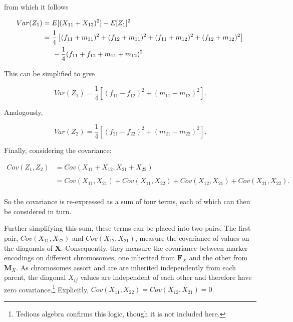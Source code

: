 \documentclass{article}
\newcommand{\m}[1]{\mathbf{#1}}               %
\begin{document}
\noindent from which it follows

\begin{equation*}
  \begin{split}
    Var(Z_1) & = E[(X_{11} + X_{12})^2] - E[Z_1]^2 \\
    & = \frac{1}{4}\left [ (f_{11} + m_{11})^2 + (f_{12} + m_{11})^2 + (f_{11} + m_{12})^2 + (f_{12} + m_{12})^2 \right ] \\
    & \hspace{0.5cm} - \frac{1}{4}(f_{11} + f_{12} + m_{11} + m_{12})^2. \\
  \end{split}
\end{equation*}

\noindent This can be simplified to give

\begin{equation} \label{eq:z1var}
  Var(Z_1) = \frac{1}{4} \left [ (f_{11} - f_{12})^2 + (m_{11} - m_{12})^2 \right ].
\end{equation}

\noindent Analogously,

\begin{equation} \label{eq:z2var}
  Var(Z_2) = \frac{1}{4} \left [ (f_{21} - f_{22})^2 + (m_{21} - m_{22})^2 \right ].
\end{equation}

\noindent Finally, considering the covariance:

\begin{equation} \label{eq:covstep1}
  \begin{split}
    Cov(Z_1, Z_2) & = Cov(X_{11} + X_{12}, X_{21} + X_{22}) \\
    & \\
    & = Cov(X_{11}, X_{21}) + Cov(X_{11}, X_{22}) + Cov(X_{12}, X_{21}) + Cov(X_{21}, X_{22}). \\
  \end{split}
\end{equation}

\noindent So the covariance is re-expressed as a sum of four terms, each of which can then be considered in turn.

Further simplifying this sum, these terms can be placed into two pairs. The first pair, $Cov(X_{11}, X_{22})$ and $Cov(X_{12}, X_{21})$, measure the covariance of values on the diagonals of $\m{X}$. Consequently, they measure the covariance between marker encodings on different chromosomes, one inherited from $\m{F}_X$ and the other from $\m{M}_X$. As chromosomes assort and are are inherited independently from each parent, the diagonal $X_{ij}$ values are independent of each other and therefore have zero covariance.\footnote{Tedious algebra confirms this logic, though it is not included here.} Explicitly,  $Cov(X_{11}, X_{22}) = Cov(X_{12}, X_{21}) = 0$.
\end{document}
